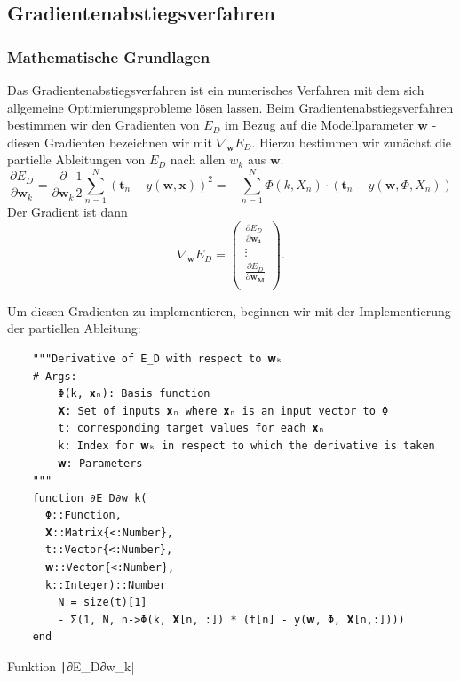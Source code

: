 \documentclass{article}
\theoremstyle{plain} %
\theoremstyle{definition} %
\begin{document}
\subsection{Gradientenabstiegsverfahren}

\subsubsection{Mathematische Grundlagen}

Das Gradientenabstiegsverfahren ist ein numerisches Verfahren mit dem sich allgemeine Optimierungsprobleme lösen lassen. Beim Gradientenabstiegsverfahren bestimmen wir den Gradienten von $E_D$ im Bezug auf die Modellparameter $\mathbf{w}$ - diesen Gradienten bezeichnen wir mit $\nabla_\mathbf{w} E_D$. Hierzu bestimmen wir zunächst die partielle Ableitungen von $E_D$ nach allen $w_k$ aus $\mathbf{w}$.
$$
  \frac{\partial E_D}{\partial \mathbf{w}_k} = \frac{\partial}{\partial \mathbf{w}_k} \frac{1}{2}\sum_{n=1}^{N}(\mathbf{t}_n - y(\mathbf{w}, \mathbf{x}))^2 = - \sum_{n=1}^N \Phi(k, X_n) \cdot (\mathbf{t}_n - y(\mathbf{w}, \Phi, X_n))
$$
Der Gradient ist dann
$$
  \nabla_\mathbf{w} E_D
    = \left( \begin{array}{c}
      \frac{\partial E_D}{\partial \mathbf{w_1}}\\
      \vdots\\
      \frac{\partial E_D}{\partial \mathbf{w_M}}\\
      \end{array} \right).
$$

Um diesen Gradienten zu implementieren, beginnen wir mit der Implementierung der partiellen Ableitung:

\begin{listing}[H]
  \begin{verbatim} 
    """Derivative of E_D with respect to 𝐰ₖ
    # Args:
        Φ(k, 𝐱ₙ): Basis function
        𝐗: Set of inputs 𝐱ₙ where 𝐱ₙ is an input vector to Φ
        t: corresponding target values for each 𝐱ₙ
        k: Index for 𝐰ₖ in respect to which the derivative is taken
        𝐰: Parameters
    """
    function ∂E_D∂w_k(
      Φ::Function,
      𝐗::Matrix{<:Number},
      t::Vector{<:Number},
      𝐰::Vector{<:Number},
      k::Integer)::Number
        N = size(t)[1]
        - Σ(1, N, n->Φ(k, 𝐗[n, :]) * (t[n] - y(𝐰, Φ, 𝐗[n,:])))
    end
  \end{verbatim}
  \caption{Funktion \texttt|∂E_D∂w_k|}
  \label{listing:partial}
\end{listing}
\end{document}
